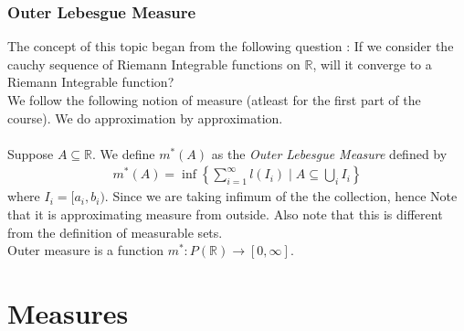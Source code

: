 \documentclass{article}
\theoremstyle{definition}
\theoremstyle{remark}
\theoremstyle{definition}
\theoremstyle{definition}
\theoremstyle{definition}
\newtheorem{lemma}{Lemma}
\newcommand{\bunion}{\bigcup}
\newcommand{\where}{\;\vert\;}
\newcommand{\R}{\mathbb{R}}
\begin{document}
\subsubsection{Outer Lebesgue Measure}
The concept of this topic began from the following question : If we consider the cauchy sequence of Riemann Integrable functions on $ \R $, will it converge to a Riemann Integrable function?\\
We follow the following notion of measure (atleast for the first part of the course). We do approximation by approximation.\\\\
Suppose $ A\subseteq \R $. We define $ m^*(A) $ as the \emph{Outer Lebesgue Measure} defined by
\begin{equation*}
	\begin{split}
		m^*(A) = \inf \left \{\sum_{i=1}^\infty l(I_i)\where A\subseteq \bunion_{i}I_i\right \}
	\end{split}
\end{equation*}
where $ I_i = [a_i,b_i) $. Since we are taking infimum of the the collection, hence Note that it is approximating measure from outside. Also note that this is different from the definition of measurable sets.\\
Outer measure is a function $ m^* : P(\R) \to [0,\infty] $. 
\newpage
\section{Measures}
\end{document}
